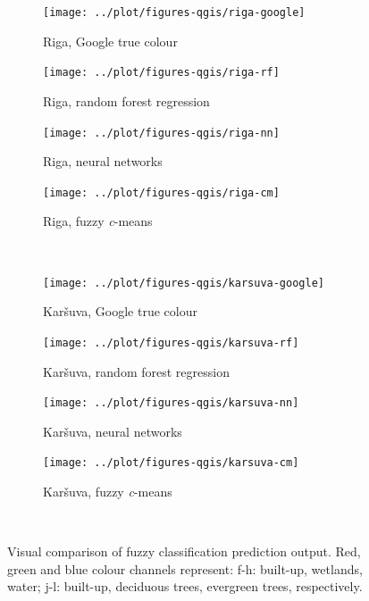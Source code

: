\documentclass[a4paper,12pt]{scrbook}
\begin{document}
\begin{figure}
  \ContinuedFloat
  \centering
  \begin{subfigure}[t]{.23\textwidth}
    \texttt{[image: ../plot/figures-qgis/riga-google]}
    \caption{Riga, Google true colour}
  \end{subfigure} \hfill
  \begin{subfigure}[t]{.23\textwidth}
    \texttt{[image: ../plot/figures-qgis/riga-rf]}
    \caption{Riga, random forest regression}
    \label{subfig-riga-rf}
  \end{subfigure} \hfill
  \begin{subfigure}[t]{.23\textwidth}
    \texttt{[image: ../plot/figures-qgis/riga-nn]}
    \caption{Riga, neural networks}
  \end{subfigure} \hfill
  \begin{subfigure}[t]{.23\textwidth}
    \texttt{[image: ../plot/figures-qgis/riga-cm]}
    \caption{Riga, fuzzy \textit{c}-means}
    \label{subfig-riga-cm}
  \end{subfigure} \
  \begin{subfigure}[t]{.23\textwidth}
    \texttt{[image: ../plot/figures-qgis/karsuva-google]}
    \caption{Kar\v{s}uva, Google true colour}
  \end{subfigure} \hfill
  \begin{subfigure}[t]{.23\textwidth}
    \texttt{[image: ../plot/figures-qgis/karsuva-rf]}
    \caption{Kar\v{s}uva, random forest regression}
    \label{subfig-karsuva-rf}
  \end{subfigure} \hfill
  \begin{subfigure}[t]{.23\textwidth}
    \texttt{[image: ../plot/figures-qgis/karsuva-nn]}
    \caption{Kar\v{s}uva, neural networks}
  \end{subfigure} \hfill
  \begin{subfigure}[t]{.23\textwidth}
    \texttt{[image: ../plot/figures-qgis/karsuva-cm]}
    \caption{Kar\v{s}uva, fuzzy \textit{c}-means}
    \label{subfig-karsuva-cm}
  \end{subfigure} \
  \caption{Visual comparison of fuzzy classification prediction output. Red, green and blue colour channels represent: f-h: built-up, wetlands, water; j-l: built-up, deciduous trees, evergreen trees, respectively.}
\end{figure}
\end{document}
